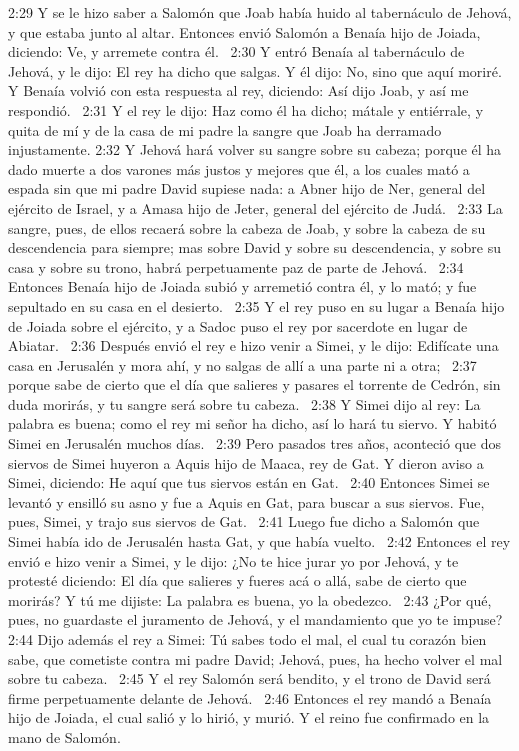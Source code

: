 2:29 Y se le hizo saber a Salomón que Joab había huido al tabernáculo de Jehová, y que estaba junto al altar. Entonces envió Salomón a Benaía hijo de Joiada, diciendo: Ve, y arremete contra él.  
2:30 Y entró Benaía al tabernáculo de Jehová, y le dijo: El rey ha dicho que salgas. Y él dijo: No, sino que aquí moriré. Y Benaía volvió con esta respuesta al rey, diciendo: Así dijo Joab, y así me respondió.  
2:31 Y el rey le dijo: Haz como él ha dicho; mátale y entiérrale, y quita de mí y de la casa de mi padre la sangre que Joab ha derramado injustamente. 
2:32 Y Jehová hará volver su sangre sobre su cabeza; porque él ha dado muerte a dos varones más justos y mejores que él, a los cuales mató a espada sin que mi padre David supiese nada: a Abner hijo de Ner, general del ejército de Israel, y a Amasa hijo de Jeter, general del ejército de Judá.  
2:33 La sangre, pues, de ellos recaerá sobre la cabeza de Joab, y sobre la cabeza de su descendencia para siempre; mas sobre David y sobre su descendencia, y sobre su casa y sobre su trono, habrá perpetuamente paz de parte de Jehová.  
2:34 Entonces Benaía hijo de Joiada subió y arremetió contra él, y lo mató; y fue sepultado en su casa en el desierto.  
2:35 Y el rey puso en su lugar a Benaía hijo de Joiada sobre el ejército, y a Sadoc puso el rey por sacerdote en lugar de Abiatar.  
2:36 Después envió el rey e hizo venir a Simei, y le dijo: Edifícate una casa en Jerusalén y mora ahí, y no salgas de allí a una parte ni a otra;  
2:37 porque sabe de cierto que el día que salieres y pasares el torrente de Cedrón, sin duda morirás, y tu sangre será sobre tu cabeza.  
2:38 Y Simei dijo al rey: La palabra es buena; como el rey mi señor ha dicho, así lo hará tu siervo. Y habitó Simei en Jerusalén muchos días.  
2:39 Pero pasados tres años, aconteció que dos siervos de Simei huyeron a Aquis hijo de Maaca, rey de Gat. Y dieron aviso a Simei, diciendo: He aquí que tus siervos están en Gat.  
2:40 Entonces Simei se levantó y ensilló su asno y fue a Aquis en Gat, para buscar a sus siervos. Fue, pues, Simei, y trajo sus siervos de Gat.  
2:41 Luego fue dicho a Salomón que Simei había ido de Jerusalén hasta Gat, y que había vuelto.  
2:42 Entonces el rey envió e hizo venir a Simei, y le dijo: ¿No te hice jurar yo por Jehová, y te protesté diciendo: El día que salieres y fueres acá o allá, sabe de cierto que morirás? Y tú me dijiste: La palabra es buena, yo la obedezco.  
2:43 ¿Por qué, pues, no guardaste el juramento de Jehová, y el mandamiento que yo te impuse?  
2:44 Dijo además el rey a Simei: Tú sabes todo el mal, el cual tu corazón bien sabe, que cometiste contra mi padre David; Jehová, pues, ha hecho volver el mal sobre tu cabeza.  
2:45 Y el rey Salomón será bendito, y el trono de David será firme perpetuamente delante de Jehová.  
2:46 Entonces el rey mandó a Benaía hijo de Joiada, el cual salió y lo hirió, y murió. Y el reino fue confirmado en la mano de Salomón.  
